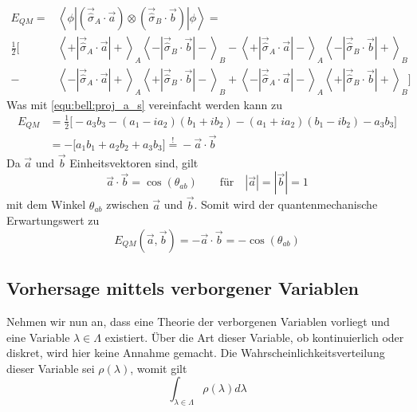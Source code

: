 \begin{refsection}
\begin{equation} 
\begin{split}
   E_{QM }=&\left\langle \phi \left| 
       \left( \vec{\hat{\sigma}}_A \cdot \vec{a} \right)
               \otimes \left( \vec{\hat{\sigma}}_B \cdot \vec{b} \right)
       \right| \phi \right\rangle
    = \\
    \frac{1}{2}\Bigg[ &
        \left\langle{+}\left| \vec{\hat{\sigma}}_A \cdot \vec{a} \right|{+}\right\rangle_A
        \left\langle{-}\left| \vec{\hat{\sigma}}_B \cdot \vec{b} \right|{-}\right\rangle_B
        -
        \left\langle{+}\left| \vec{\hat{\sigma}}_A \cdot \vec{a} \right|{-}\right\rangle_A
        \left\langle{-}\left| \vec{\hat{\sigma}}_B \cdot \vec{b} \right|{+}\right\rangle_B \\
        - &
        \left\langle{-}\left| \vec{\hat{\sigma}}_A \cdot \vec{a} \right|{+}\right\rangle_A
        \left\langle{+}\left| \vec{\hat{\sigma}}_B \cdot \vec{b} \right|{-}\right\rangle_B
        +
        \left\langle{-}\left| \vec{\hat{\sigma}}_A \cdot \vec{a} \right|{-}\right\rangle_A
        \left\langle{+}\left| \vec{\hat{\sigma}}_B \cdot \vec{b} \right|{+}\right\rangle_B
    \Bigg]
\end{split}
\end{equation}
Was mit \eqref{equ:bell:proj_a_s} vereinfacht werden kann zu
\begin{equation}\label{equ:bell:e_qm}
\begin{split}
    E_{QM} &= \frac{1}{2} \big[ -a_3b_3 - (a_1-ia_2)(b_1+ib_2) - (a_1+ia_2)(b_1-ib_2) - a_3b_3 \big] \\
    &= -\big[ a_1b_1 + a_2b_2 + a_3b_3 \big] \stackrel{!}{=} -\vec{a} \cdot \vec{b}
\end{split}
\end{equation}
Da $\vec{a}$ und $\vec{b}$ Einheitsvektoren sind, gilt
\begin{equation}
    \vec{a} \cdot \vec{b} = \cos(\theta_{ab}) \qquad \text{f\"ur} \quad |\vec{a}| = |\vec{b}| = 1
\end{equation}
mit dem Winkel $\theta_{ab}$ zwischen $\vec{a}$ und $\vec{b}$.
Somit wird der quantenmechanische Erwartungswert zu
\begin{equation}
    E_{QM}(\vec{a},\vec{b}) = -\vec{a}\cdot\vec{b} = -\cos(\theta_{ab})
\end{equation}

\subsection{Vorhersage mittels verborgener Variablen}
Nehmen wir nun an, dass eine Theorie der verborgenen Variablen vorliegt
und eine Variable $\lambda \in \Lambda$ existiert.
\"Uber die Art dieser Variable, ob kontinuierlich oder diskret, wird hier keine
Annahme gemacht.
Die Wahrscheinlichkeitsverteilung dieser Variable sei $\rho(\lambda)$, womit gilt
\begin{equation}\label{equ:bell:lambdaverteilung}
    \int_{\lambda\in\Lambda} \rho(\lambda) d\lambda
\end{equation}


\end{refsection}
